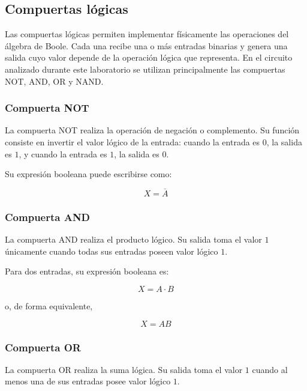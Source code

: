 \documentclass[12pt]{report}
\begin{document}
\subsection{Compuertas lógicas}

Las compuertas lógicas permiten implementar físicamente las operaciones del álgebra
de Boole. Cada una recibe una o más entradas binarias y genera una salida cuyo valor
depende de la operación lógica que representa. En el circuito analizado durante este
laboratorio se utilizan principalmente las compuertas NOT, AND, OR y NAND.

\subsubsection{Compuerta NOT}

La compuerta NOT realiza la operación de negación o complemento. Su función consiste
en invertir el valor lógico de la entrada: cuando la entrada es $0$, la salida es $1$,
y cuando la entrada es $1$, la salida es $0$.

Su expresión booleana puede escribirse como:

\begin{equation}
    X = \overline{A}
\end{equation}

\subsubsection{Compuerta AND}

La compuerta AND realiza el producto lógico. Su salida toma el valor $1$ únicamente
cuando todas sus entradas poseen valor lógico $1$.

Para dos entradas, su expresión booleana es:

\begin{equation}
    X = A \cdot B
\end{equation}

o, de forma equivalente,

\begin{equation}
    X = AB
\end{equation}

\subsubsection{Compuerta OR}

La compuerta OR realiza la suma lógica. Su salida toma el valor $1$ cuando al menos
una de sus entradas posee valor lógico $1$.
\end{document}
